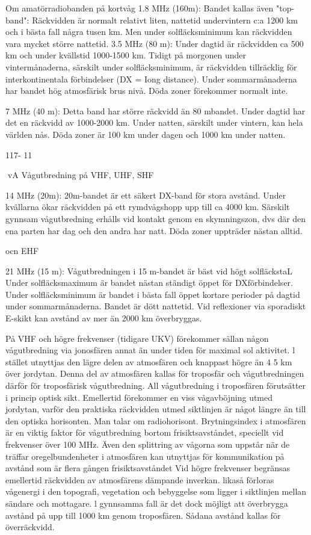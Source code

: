 \documentclass[a4paper,twoside,twocolumn,openright]{book}
\begin{document}
{{{{{Om amatörradiobanden på kortvåg
1.8 MHz (160m):
Bandet kallas även "top-band": Räckvidden
är normalt relativt liten, nattetid undervintern
c:a 1200 km och i bästa fall några tusen km.
Men under solfläcksminimum kan räckvidden vara mycket större nattetid.
3.5 MHz (80 m):
Under dagtid är räckvidden ca 500 km och
under kvällstid 1000-1500 km. Tidigt på
morgonen under vintermånaderna, särskilt
under solfläcksminimum, är räckvidden tillräcklig för interkontinentala förbindelser (DX
= Iong distance). Under sommarmånaderna
har bandet hög atmosfärisk brus nivå. Döda
zoner förekommer normalt inte.

7 MHz (40 m):
Detta band har större räckvidd än 80 mbandet. Under dagtid har det en räckvidd av
1000-2000 km. Under natten, särskilt under
vintern, kan hela världen nås. Döda zoner är
100 km under dagen och 1000 km under
natten.

117- 11

vA
Vågutbredning på VHF, UHF, SHF

14 MHz (20m):
20m-bandet är ett säkert DX-band för stora
avstånd. Under kvällarna ökar räckvidden
på ett rymdvågshopp upp till ca 4000 km.
Särskilt gynnsam vågutbredning erhålls vid
kontakt genom en skymningszon, dvs där
den ena parten har dag och den andra har
natt. Döda zoner uppträder nästan alltid.

ocn EHF

21 MHz (15 m):
Vågutbredningen i 15 m-bandet är bäst vid
högt solfläckstaL Under solfläcksmaximum
är bandet nästan ständigt öppet för DXförbindelser.
Under solfläcksminimum är bandet i bästa
fall öppet kortare perioder på dagtid under
sommarmånaderna.
Bandet är dött nattetid. Vid reflexioner via
sporadiskt E-skikt kan avstånd av mer än
2000 km överbryggas.

På VHF och högre frekvenser (tidigare UKV)
förekommer sällan någon vågutbredning via
jonosfären annat än under tiden för maximal
sol aktivitet. l stället utnyttjas den lägre delen
av atmosfären och knappast högre än 4 5
km över jordytan. Denna del av atmosfären
kallas för troposfär och vågutbredningen
därför för troposfärisk vågutbredning.
All vågutbredning i troposfären förutsätter i princip optisk sikt. Emellertid förekommer en viss vågavböjning utmed jordytan,
varför den praktiska räckvidden utmed siktlinjen är något längre än till den optiska
horisonten. Man talar om radiohorisont.
Brytningsindex i atmosfären är en viktig
faktor för vågutbredning bortom frisiktsavståndet, speciellt vid frekvenser över 100
MHz. Även den splittring av vågorna som
uppstår när de träffar oregelbundenheter i
atmosfären kan utnyttjas för kommunikation
på avstånd som är flera gången frisiktsavståndet
Vid högre frekvenser begränsas emellertid räckvidden av atmosfärens dämpande
inverkan. likaså förloras vågenergi i den
topografi, vegetation och bebyggelse som
ligger i siktlinjen mellan sändare och mottagare. l gynnsamma fall är det dock möjligt att
överbrygga avstånd på upp till 1000 km
genom troposfären. Sådana avstånd kallas
för överräckvidd.

}}}}}
\end{document}
